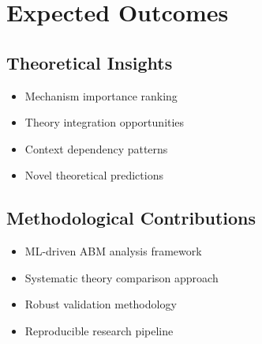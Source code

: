 \documentclass[12pt]{article}
\begin{document}
\section{Expected Outcomes}

\subsection{Theoretical Insights}
\begin{itemize}
    \item Mechanism importance ranking
    \item Theory integration opportunities
    \item Context dependency patterns
    \item Novel theoretical predictions
\end{itemize}

\subsection{Methodological Contributions}
\begin{itemize}
    \item ML-driven ABM analysis framework
    \item Systematic theory comparison approach
    \item Robust validation methodology
    \item Reproducible research pipeline
\end{itemize}
\end{document}
